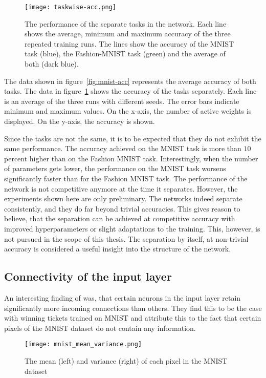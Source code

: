 \begin{figure}[ht]
    \centering
    \texttt{[image: taskwise-acc.png]}
    \caption[Taskwise performance]{
        The performance of the separate tasks in the network.
        Each line shows the average, minimum and maximum accuracy of the three repeated training runs.
        The lines show the accuracy of the MNIST task (blue), the Fashion-MNIST task (green) and the average of both (dark blue).
    }\label{fig:taskwise-acc}
\end{figure}

The data shown in figure~\ref{fig:mnist-acc} represents the average accuracy of both tasks.
The data in figure~\ref{fig:taskwise-acc} shows the accuracy of the tasks separately.
Each line is an average of the three runs with different seeds.
The error bars indicate minimum and maximum values.
On the x-axis, the number of active weights is displayed.
On the y-axis, the accuracy is shown.

Since the tasks are not the same, it is to be expected that they do not exhibit the same performance.
The accuracy achieved on the MNIST task is more than $10$ percent higher than on the Fashion MNIST task.
Interestingly, when the number of parameters gets lower, the performance on the MNIST task worsens significantly faster than for the Fashion MNIST task.
The performance of the network is not competitive anymore at the time it separates.
However, the experiments shown here are only preliminary.
The networks indeed separate consistently, and they do far beyond trivial accuracies.
This gives reason to believe, that the separation can be achieved at competitive accuracy with improved hyperparameters or slight adaptations to the training.
This, however, is not pursued in the scope of this thesis.
The separation by itself, at non-trivial accuracy is considered a useful insight into the structure of the network.

\subsection{Connectivity of the input layer}
An interesting finding of \textcite{LTH} was, that certain neurons in the input layer retain significantly more incoming connections than others.
They find this to be the case with winning tickets trained on MNIST and attribute this to the fact that certain pixels of the MNIST dataset do not contain any information.
\begin{figure}[ht] %
    \centering \texttt{[image: mnist\_mean\_variance.png]}
    \caption[Mean and Variance MNIST]{
    The mean (left) and variance (right) of each pixel in the MNIST dataset
    }\label{fig:mnist-input-variance}
\end{figure}

